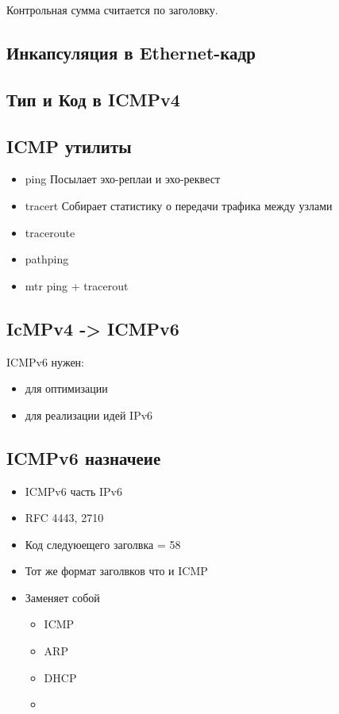\documentclass[10pt,a4paper,oneside,titlepage]{report}
\theoremstyle{defenition}
\begin{document}
Контрольная сумма считается по заголовку.

\subsection{Инкапсуляция  в Ethernet-кадр}

\subsection{Тип и Код в ICMPv4}

\subsection{ICMP утилиты}

\begin{itemize}
	\item ping
	Посылает эхо-реплаи и эхо-реквест
	\item tracert
	Собирает статистику о передачи трафика между узлами
	\item traceroute
	\item pathping
	\item mtr
	ping + tracerout
\end{itemize}

\subsection{IcMPv4 -> ICMPv6}

ICMPv6 нужен:
\begin{itemize}
	\item для оптимизации
	\item для реализации идей IPv6
\end{itemize}

\subsection{ICMPv6 назначеие}

\begin{itemize}
	\item ICMPv6 часть IPv6
	\item RFC 4443, 2710
	\item Код следуюещего заголвка = 58
	\item Тот же формат заголвков что и ICMP
	\item Заменяет собой
	\begin{itemize}
		\item ICMP
		\item ARP
		\item DHCP
		\item 
	\end{itemize}
\end{itemize}
\end{document}
